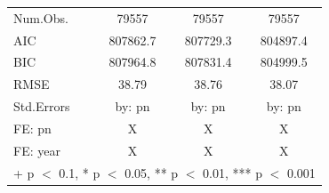\documentclass[
]{article}
\begin{document}
\begin{table}
\begin{tabular}[t]{lccc}
\midrule
Num.Obs. & \num{79557} & \num{79557} & \num{79557}\\
AIC & \num{807862.7} & \num{807729.3} & \num{804897.4}\\
BIC & \num{807964.8} & \num{807831.4} & \num{804999.5}\\
RMSE & \num{38.79} & \num{38.76} & \num{38.07}\\
Std.Errors & by: pn & by: pn & by: pn\\
FE: pn & X & X & X\\
FE: year & X & X & X\\
\bottomrule
\multicolumn{4}{l}{\rule{0pt}{1em}+ p $<$ 0.1, * p $<$ 0.05, ** p $<$ 0.01, *** p $<$ 0.001}\\
\end{tabular}
\end{table}
\end{document}
